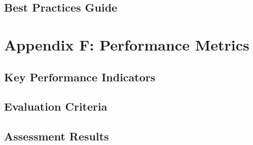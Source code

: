\subsection{Best Practices Guide}

\section{Appendix F: Performance Metrics}

\subsection{Key Performance Indicators}

\subsection{Evaluation Criteria}

\subsection{Assessment Results}
